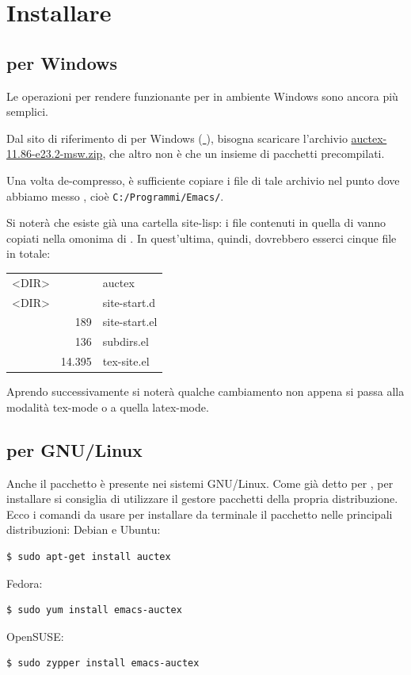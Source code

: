 \documentclass[10pt,a4paper]{article}
\begin{document}
\section{Installare \auctex}
\label{sec:installauc}

\subsection*{\auctex{} per Windows}
\label{sec:auctexwin}

Le operazioni per rendere funzionante \auctex{} per \emacs{} in ambiente
Windows sono ancora più semplici.

Dal sito di riferimento di \auctex{} per Windows 
(\href{%
http://www.gnu.org/software/auctex/download-for-windows.html}%
{\mano{} \auctex}), bisogna scaricare l'archivio \href{%
http://ftp.gnu.org/pub/gnu/auctex/auctex-11.86-e23.2-msw.zip}%
{\textsf{auctex-11.86-e23.2-msw.zip}}, che altro non è che un insieme di
pacchetti precompilati.

Una volta de-compresso, è sufficiente copiare i file di tale archivio
nel punto dove abbiamo messo \emacs{}, cioè
\texttt{C:/Programmi/Emacs/}.

 Si noterà che esiste già una cartella
\textsf{site-lisp}: i file contenuti in  quella di \auctex{} vanno copiati
nella omonima di \emacs. In quest'ultima, quindi, dovrebbero
esserci cinque file in totale:

\begin{center}\ttfamily
 \begin{tabular}{lrl}
  <DIR>&       &        auctex\\
  <DIR>&       &  site-start.d\\
       &    189& site-start.el\\
       &    136&    subdirs.el\\
       & 14.395&   tex-site.el\\
 \end{tabular}
\end{center}

Aprendo successivamente \emacs{} si noterà qualche cambiamento
non appena si passa alla modalità \textsf{tex-mode} o a quella \textsf{latex-mode}.

\subsection*{\auctex{} per GNU/Linux}
\label{sec:auctexlinux}

Anche il pacchetto \auctex{} è presente nei sistemi GNU/Linux. Come già detto
per \emacs, per installare \auctex{} si consiglia di utilizzare il gestore
pacchetti della propria distribuzione. Ecco i comandi da usare per
installare da terminale il pacchetto nelle principali distribuzioni: Debian e Ubuntu:
\begin{Verbatim}
$ sudo apt-get install auctex
\end{Verbatim}
Fedora:
\begin{Verbatim}
$ sudo yum install emacs-auctex
\end{Verbatim}
OpenSUSE:
\begin{Verbatim}
$ sudo zypper install emacs-auctex
\end{Verbatim}
\end{document}
